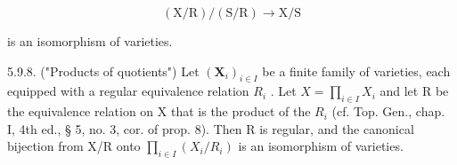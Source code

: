\[
(\mathrm{X} / \mathrm{R}) / (\mathrm{S} / \mathrm{R}) \rightarrow \mathrm{X} / \mathrm{S}
\]

is an isomorphism of varieties.

5.9.8. ("Products of quotients") Let \((\mathbf{X}_{i})_{i\in I}\) be a finite family of varieties, each equipped with a regular equivalence relation \(R_{i}\) . Let \(X = \prod_{i\in I} X_{i}\) and let R be the equivalence relation on X that is the product of the \(R_{i}\) (cf. Top. Gen., chap. I, 4th ed., § 5, no. 3, cor. of prop. 8). Then R is regular, and the canonical bijection from X/R onto \(\prod_{i\in I}(X_{i}/R_{i})\) is an isomorphism of varieties.

